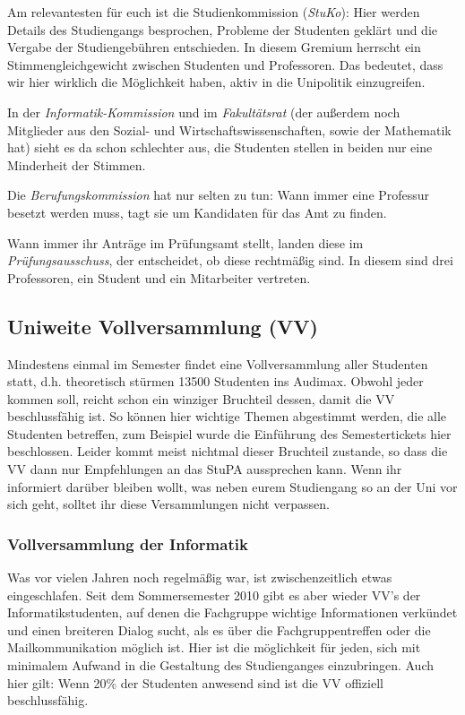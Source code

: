 		Am relevantesten für euch ist die Studienkommission (\emph{StuKo}): Hier werden Details des Studiengangs besprochen, Probleme der Studenten geklärt und die Vergabe der Studiengebühren entschieden. In diesem Gremium herrscht ein Stimmengleichgewicht zwischen Studenten und Professoren. Das bedeutet, dass wir hier wirklich die Möglichkeit haben, aktiv in die Unipolitik einzugreifen.

		In der \emph{Informatik-Kommission} und im
		\emph{Fakultätsrat} (der außerdem noch Mitglieder aus
		den Sozial- und Wirtschaftswissenschaften, sowie der Mathematik hat) sieht es da schon schlechter aus, die Studenten stellen in beiden nur eine Minderheit der Stimmen.

		Die \emph{Berufungskommission} hat nur selten zu tun: Wann immer eine Professur besetzt werden muss, tagt sie um Kandidaten für das Amt zu finden.

		Wann immer ihr Anträge im Prüfungsamt stellt, landen diese im \emph{Prüfungsausschuss}, der entscheidet, ob diese rechtmäßig sind. In diesem sind drei Professoren, ein Student und ein Mitarbeiter vertreten.

	\subsection*{Uniweite Vollversammlung (VV)}
		Mindestens einmal im Semester findet eine
		Vollversammlung aller Studenten statt, d.h. theoretisch
		stürmen 13500 Studenten ins Audimax. Obwohl jeder kommen
		soll, reicht schon ein winziger Bruchteil dessen, damit
		die VV beschlussfähig ist. So können hier wichtige
		Themen abgestimmt werden, die alle Studenten betreffen,
		zum Beispiel wurde die Einführung des Semestertickets
		hier beschlossen. Leider kommt meist nichtmal dieser
		Bruchteil zustande, so dass die VV dann nur Empfehlungen
		an das StuPA aussprechen kann. Wenn ihr informiert darüber 
		bleiben wollt, was neben eurem Studiengang so an der Uni vor sich geht, solltet ihr diese Versammlungen nicht verpassen.

		\subsubsection*{Vollversammlung der Informatik}
			Was vor vielen Jahren noch regelmäßig war, ist
			zwischenzeitlich etwas eingeschlafen. Seit dem
			Sommersemester 2010 gibt es aber wieder VV's der
			Informatikstudenten, auf denen die Fachgruppe
			wichtige Informationen verkündet und einen
			breiteren Dialog sucht, als es über die
			Fachgruppentreffen oder die Mailkommunikation
			möglich ist. Hier ist die möglichkeit für jeden,
			sich mit minimalem Aufwand in die Gestaltung des
			Studienganges einzubringen. Auch hier gilt: Wenn
			20\% der Studenten anwesend sind  ist die VV offiziell beschlussfähig.
	
